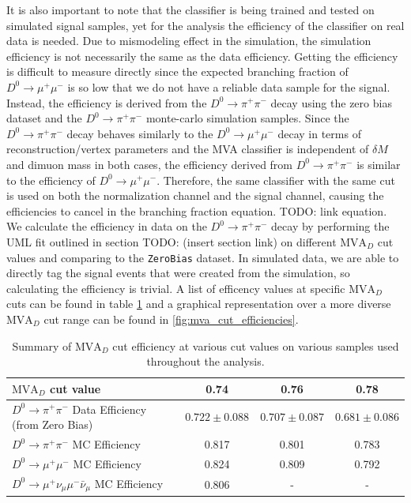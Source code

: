 It is also important to note that the classifier is being trained and tested on simulated signal samples, yet for the analysis the efficiency of the classifier on real data is needed. Due to mismodeling effect in the simulation, the simulation efficiency is not necessarily the same as the data efficiency. Getting the efficiency is difficult to measure directly since the expected branching fraction of $D^0 \to \mu^+ \mu^-$ is so low that we do not have a reliable data sample for the signal. Instead, the efficiency is derived from the $D^0 \to \pi^+ \pi^-$ decay using the zero bias dataset and the $D^0 \to \pi^+ \pi^-$ monte-carlo simulation samples. Since the $D^0 \to \pi^+ \pi^-$ decay behaves similarly to the $D^0 \to \mu^+ \mu^-$ decay in terms of reconstruction/vertex parameters and the MVA classifier is independent of $\delta M$ and dimuon mass in both cases, the efficiency derived from $D^0 \to \pi^+ \pi^-$ is similar to the efficiency of $D^0 \to \mu^+ \mu^-$. Therefore, the same classifier with the same cut is used on both the normalization channel and the signal channel, causing the efficiencies to cancel in the branching fraction equation. TODO: link equation. We calculate the efficiency in data on the $D^0 \to \pi^+ \pi^-$ decay by performing the UML fit outlined in section TODO: (insert section link) on different $\text{MVA}_D$ cut values and comparing to the \texttt{ZeroBias} dataset. In simulated data, we are able to directly tag the signal events that were created from the simulation, so calculating the efficiency is trivial. A list of efficency values at specific $\text{MVA}_D$ cuts can be found in table \ref{tab:mva_cut_efficiencies} and a graphical representation over a more diverse $\text{MVA}_D$ cut range can be found in \ref{fig:mva_cut_efficiencies}.

\begin{table}[htbp]
    \centering
    \begin{tabular}{|l|c|c|c|}
    \hline
    $\text{MVA}_D$ cut value & \textbf{0.74} & \textbf{0.76} & \textbf{0.78} \\
    \hline
    $D^0 \to \pi^+ \pi^-$ Data Efficiency (from Zero Bias) & $0.722 \pm 0.088$ & $0.707 \pm 0.087$ & $0.681 \pm 0.086$ \\
    $D^0 \to \pi^+ \pi^-$ MC Efficiency & 0.817 & 0.801 & 0.783 \\
    $D^0 \to \mu^+ \mu^-$ MC Efficiency & 0.824 & 0.809 & 0.792 \\
    $D^0 \to \mu^+\nu_\mu\mu^-\bar{\nu}_\mu$ MC Efficiency & 0.806 & - & - \\
    \hline
    \end{tabular}
    \caption{Summary of $\text{MVA}_D$ cut efficiency at various cut values on various samples used throughout the analysis.}
    \label{tab:mva_cut_efficiencies}
\end{table}

